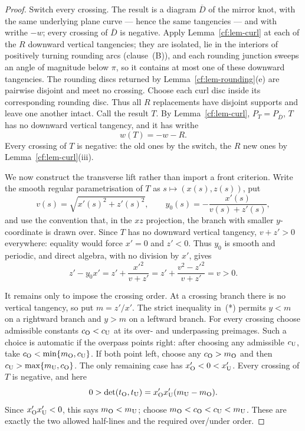 \begin{proof}
Switch every crossing. The result is a diagram $\overline D$ of the mirror knot,
with the same underlying plane curve --- hence the same tangencies --- and with
writhe $-w$; every crossing of $\overline D$ is negative. Apply
Lemma~\ref{cf:lem-curl} at each of the $R$ downward vertical tangencies; they are
isolated, lie in the interiors of positively turning rounding arcs
(clause~(B)), and each rounding junction sweeps an angle of magnitude below $\pi$, so it
contains at most one of these downward tangencies. The rounding discs
returned by Lemma~\ref{cf:lem-rounding}(e) are pairwise disjoint and meet no
crossing. Choose each curl disc inside its corresponding rounding disc.
Thus all $R$ replacements have disjoint supports and leave one another
intact. Call the result $T$. By
Lemma~\ref{cf:lem-curl}, $P_T=P_{\overline D}$, $T$ has no downward vertical
tangency, and it has writhe
\[
w(T)=-w-R .
\]
Every crossing of $T$ is negative: the old ones by the switch, the $R$ new ones by
Lemma~\ref{cf:lem-curl}(iii).

We now construct the transverse lift rather than import a
front criterion.  Write the smooth regular parametrisation of $T$ as
$s\mapsto(x(s),z(s))$, put
\[
 v(s)=\sqrt{x'(s)^2+z'(s)^2},\qquad
 y_0(s)=-\frac{x'(s)}{v(s)+z'(s)},
\]
and use the convention that, in the $xz$ projection, the branch with smaller
$y$-coordinate is drawn over.  Since $T$ has no downward vertical tangency,
$v+z'>0$ everywhere: equality would force $x'=0$ and $z'<0$.  Thus $y_0$ is
smooth and periodic, and direct algebra, with no division by $x'$, gives
\[
 z'-y_0x'=z'+\frac{x'^2}{v+z'}
 =z'+\frac{v^2-z'^2}{v+z'}=v>0.                 \tag{*}
\]

It remains only to impose the crossing order.  At a crossing branch there is
no vertical tangency, so put $m=z'/x'$.  The strict inequality in~(*) permits
$y<m$ on a rightward branch and $y>m$ on a leftward branch.  For every crossing
choose admissible constants $c_{\rm O}<c_{\rm U}$ at its over- and underpassing
preimages.  Such a choice is automatic if the overpass points right: after
choosing any admissible $c_{\rm U}$, take
$c_{\rm O}<\min\{m_{\rm O},c_{\rm U}\}$.  If both point left, choose any
$c_{\rm O}>m_{\rm O}$ and then
$c_{\rm U}>\max\{m_{\rm U},c_{\rm O}\}$.  The only remaining case has
$x'_{\rm O}<0<x'_{\rm U}$.  Every crossing of $T$ is negative, and here
\[
 0>\det(t_{\rm O},t_{\rm U})
   =x'_{\rm O}x'_{\rm U}(m_{\rm U}-m_{\rm O}).
\]
Since $x'_{\rm O}x'_{\rm U}<0$, this says $m_{\rm O}<m_{\rm U}$; choose
$m_{\rm O}<c_{\rm O}<c_{\rm U}<m_{\rm U}$.  These are exactly the two allowed
half-lines and the required over/under order.


\end{proof}
